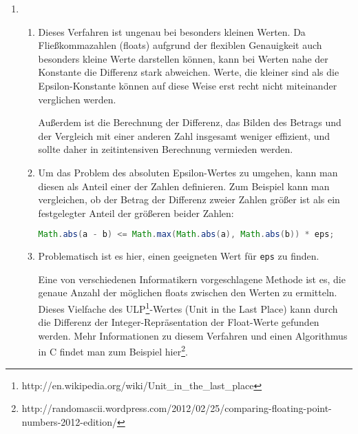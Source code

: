 \documentclass[a4paper,10pt]{scrartcl}
\author{\authorinfo}
\title{\titleinfo}
\date{\today}
\begin{document}
\setcounter{secnumdepth}{0}
\maketitle


\begin{enumerate}
    \item[\textbf{1.}]
        \begin{enumerate}
            \item[a)]
                Dieses Verfahren ist ungenau bei besonders kleinen Werten. Da Fließkommazahlen (floats)
                aufgrund der flexiblen Genauigkeit auch besonders kleine Werte darstellen können, kann
                bei Werten nahe der Konstante die Differenz stark abweichen. Werte, die kleiner sind als
                die Epsilon-Konstante können auf diese Weise erst recht nicht miteinander verglichen werden.

                Außerdem ist die Berechnung der Differenz, das Bilden des Betrags und der Vergleich mit einer
                anderen Zahl insgesamt weniger effizient, und sollte daher in zeitintensiven Berechnung vermieden werden.

            \item[b)]
                Um das Problem des absoluten Epsilon-Wertes zu umgehen, kann man diesen als Anteil einer der Zahlen
                definieren. Zum Beispiel kann man vergleichen, ob der Betrag der Differenz zweier Zahlen
                größer ist als ein festgelegter Anteil der größeren beider Zahlen:

\begin{lstlisting}[language=java]
    Math.abs(a - b) <= Math.max(Math.abs(a), Math.abs(b)) * eps;
\end{lstlisting}

            \item[c)]
                Problematisch ist es hier, einen geeigneten Wert für \lstinline|eps| zu finden.

                Eine von verschiedenen Informatikern vorgeschlagene Methode ist es, die genaue
                Anzahl der möglichen floats zwischen den Werten zu ermitteln. Dieses Vielfache
                des ULP\footnote{http://en.wikipedia.org/wiki/Unit\_in\_the\_last\_place}-Wertes (Unit in the Last Place)
                kann durch die Differenz der Integer-Repräsentation der Float-Werte gefunden
                werden. Mehr Informationen zu diesem Verfahren und einen Algorithmus in C
                findet man zum Beispiel hier\footnote{http://randomascii.wordpress.com/2012/02/25/comparing-floating-point-numbers-2012-edition/}.


\end{enumerate}
\end{enumerate}
\end{document}
